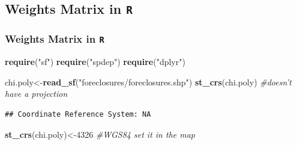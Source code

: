 \documentclass[
  shownotes,
  xcolor={svgnames},
  hyperref={colorlinks,citecolor=DarkBlue,linkcolor=DarkRed,urlcolor=DarkBlue}
  ]{beamer}
\newenvironment{Shaded}{\begin{snugshade}}{\end{snugshade}}
\newcommand{\CommentTok}[1]{\textcolor[rgb]{0.56,0.35,0.01}{\textit{#1}}}
\newcommand{\DecValTok}[1]{\textcolor[rgb]{0.00,0.00,0.81}{#1}}
\newcommand{\KeywordTok}[1]{\textcolor[rgb]{0.13,0.29,0.53}{\textbf{#1}}}
\newcommand{\NormalTok}[1]{#1}
\newcommand{\StringTok}[1]{\textcolor[rgb]{0.31,0.60,0.02}{#1}}
\begin{document}
\subsection{Weights Matrix in \texttt{R}}
\begin{frame}[fragile]
\frametitle{Weights Matrix in \texttt{R}}


\begin{scriptsize}
\begin{Shaded}
\begin{Highlighting}[]
\KeywordTok{require}\NormalTok{(}\StringTok{"sf"}\NormalTok{)}
\KeywordTok{require}\NormalTok{(}\StringTok{"spdep"}\NormalTok{)}
\KeywordTok{require}\NormalTok{(}\StringTok{"dplyr"}\NormalTok{)}
\end{Highlighting}
\end{Shaded}

\begin{Shaded}
\begin{Highlighting}[]
\NormalTok{chi.poly\textless{}{-}}\KeywordTok{read\_sf}\NormalTok{(}\StringTok{"foreclosures/foreclosures.shp"}\NormalTok{)}
\KeywordTok{st\_crs}\NormalTok{(chi.poly) }\CommentTok{\#doesn't have a projection}
\end{Highlighting}
\end{Shaded}

\end{scriptsize}

\begin{verbatim}
## Coordinate Reference System: NA
\end{verbatim}

\begin{scriptsize}
\begin{Shaded}
\begin{Highlighting}[]
\KeywordTok{st\_crs}\NormalTok{(chi.poly)\textless{}{-}}\DecValTok{4326} \CommentTok{\#WGS84 set it in the map}
\end{Highlighting}
\end{Shaded}
\end{scriptsize}

\end{frame}
\end{document}
